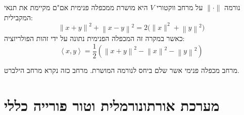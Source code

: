 \documentclass{tstextbook}
\begin{document}
\begin{proposition}
נורמה \(\lVert \cdot \rVert\) על מרחב ווקטורי \(V\) היא מושרת ממכפלה פנימית אם"ם מקיימת את תנאי המקבילית:
$$\left\|x+y\right\|^{2}+\left\|x-y\right\|^{2}=2{\bigl(}\|x\|^{2}+\left\|y\right\|^{2}{\bigr)}$$
כאשר במקרה זה המכפלה הפנימית נתונה על ידי זהות הפולריזציה:
$$\left\langle x,y\right\rangle={\frac{1}{2}}\left(\left\|x+y\right\|^{2}-\left\|x\right\|^{2}-\left\|y\right\|^{2}\right)$$

\end{proposition}
\begin{definition}
מרחב מכפלה פנימי אשר שלם ביחס לנורמה המושרת. מרחב כזה נקרא מרחב הילברט.

\end{definition}
\section{מערכת אורתונורמלית וטור פורייה כללי}
\end{document}
